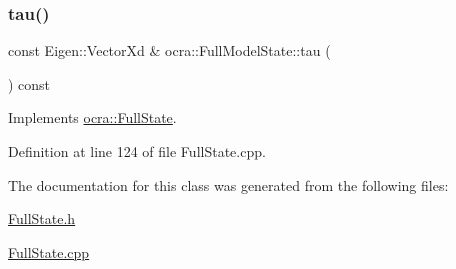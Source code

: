 \subsubsection{\texorpdfstring{tau()}{tau()}}
{\footnotesize\ttfamily const Eigen\+::\+Vector\+Xd \& ocra\+::\+Full\+Model\+State\+::tau (\begin{DoxyParamCaption}{ }\end{DoxyParamCaption}) const\hspace{0.3cm}{\ttfamily [virtual]}}



Implements \hyperlink{classocra_1_1FullState_a24723b4a382c2bf51e6c32cbd1bd7b06}{ocra\+::\+Full\+State}.



Definition at line 124 of file Full\+State.\+cpp.



The documentation for this class was generated from the following files\+:\begin{DoxyCompactItemize}
\item 
\hyperlink{FullState_8h}{Full\+State.\+h}\item 
\hyperlink{FullState_8cpp}{Full\+State.\+cpp}\end{DoxyCompactItemize}
